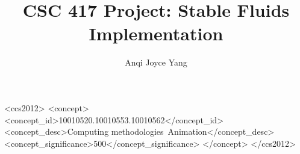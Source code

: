 \documentclass[sigconf]{acmart}
\begin{document}
\title{CSC 417 Project: Stable Fluids Implementation}

\author{Anqi Joyce Yang}

\begin{CCSXML}
<ccs2012>
 <concept>
  <concept_id>10010520.10010553.10010562</concept_id>
  <concept_desc>Computing methodologies~Animation</concept_desc>
  <concept_significance>500</concept_significance>
 </concept>
</ccs2012>
\end{CCSXML}



\end{document}
